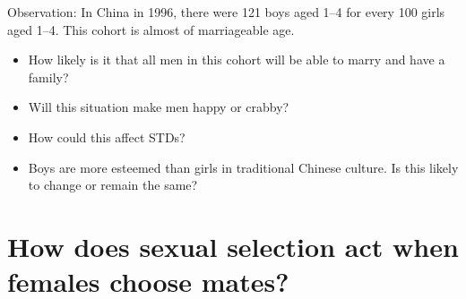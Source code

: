 \begin{frame}[t]
    \begin{adjustwidth}{-2em}{-1.5em}
        Observation: In China in 1996, there were 121 boys aged 1--4 for every
        100 girls aged 1--4. This cohort is almost of marriageable age.

        \begin{itemize}
            \item How likely is it that all men in this cohort will
                be able to marry and have a family?
            

                \vspace{3mm}
            \item Will this situation make men happy or crabby?


                \vspace{3mm}
            \item How could this affect STDs?


                \vspace{3mm}
            \item Boys are more esteemed than girls in traditional Chinese
                culture. Is this likely to change or remain the same?

        \end{itemize}


    \end{adjustwidth}
\end{frame}

\section[How does sexual selection act when females choose mates?]{How does
    sexual selection act when females choose mates?}


